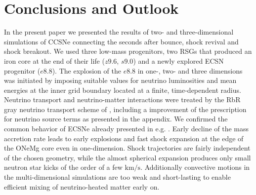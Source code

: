 \documentclass[fleqn,usenatbib]{mnras}
\newcommand{\kms}{$\mathrm{km/s}$\xspace}
\begin{document}
\section{Conclusions and Outlook}
In the present paper we presented the results of two- and three-dimensional simulations of CCSNe connecting the seconds after bounce, shock revival and shock breakout. We used three low-mass progenitors, two RSGs that produced an iron core at the end of their life ($z9.6$, $s9.0$) and a newly explored ECSN progenitor ($e8.8$). 
The explosion of the $e8.8$ in one-, two- and three dimensions was initiated by imposing suitable values for neutrino luminosities and mean energies at the inner grid boundary located at a finite, time-dependent radius. Neutrino transport and neutrino-matter interactions were treated by the RbR gray neutrino transport scheme of \citet{Scheck2006}, including a improvement of the prescription for neutrino source terms as presented in the appendix. We confirmed the common behavior of ECSNe already presented in e.g. \citet{Kitaura2006,Gessner2018}. Early decline of the mass accretion rate leads to early explosions and fast shock expansion at the edge of the ONeMg core even in one-dimension. Shock trajectories are fairly independent of the chosen geometry, while the almost spherical expansion produces only small neutron star kicks of the order of a few \kms. Additionally convective motions in the multi-dimensional simulations are too weak and short-lasting to enable efficient mixing of neutrino-heated matter early on.
\end{document}
